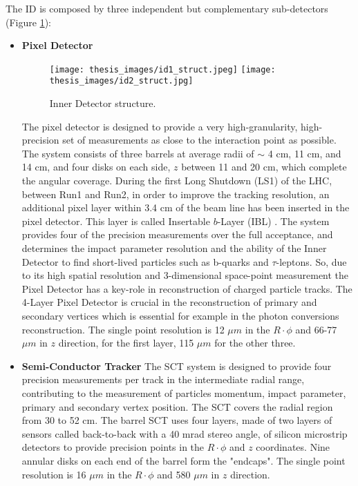 \documentclass[a4paper, oneside, 11pt, openright]{book}
\begin{document}
				The ID is composed by three independent but complementary sub-detectors \cite{ID_report} (Figure \ref{fig:ID_struct}):
				\begin{itemize}
					\item \textbf{Pixel Detector}
						\begin{figure}
							\centering
							\texttt{[image: thesis\_images/id1\_struct.jpeg]}
							\texttt{[image: thesis\_images/id2\_struct.jpg]}
							\caption{Inner Detector structure.}
							\label{fig:ID_struct}
						\end{figure}
						The pixel detector \cite{ID_inner_report} is designed to provide a very high-granularity, high-precision set of measurements as close to the interaction point as possible. The system consists of three barrels at average radii of $\sim$ 4 cm, 11 cm, and 14 cm, and four disks on each side, $z$ between 11 and 20 cm, which complete the angular coverage. During the first Long Shutdown (LS1) of the LHC, between Run1 and Run2, in order to improve the tracking resolution, an additional pixel layer within 3.4 cm of the beam line has been inserted in the pixel detector. This layer is called Insertable $b$-Layer (IBL) \cite{IBL_report}. The system provides four of the precision measurements over the full acceptance, and determines the impact parameter resolution and the ability of the Inner Detector to find short-lived particles such as b-quarks and $\tau$-leptons. So, due to its high spatial resolution and 3-dimensional space-point measurement the Pixel Detector has a key-role in reconstruction of charged particle tracks. The 4-Layer Pixel Detector is crucial in the reconstruction of primary and secondary vertices which is essential for example in the photon conversions reconstruction. The single point resolution is 12 $\mu m$ in the $R\cdot\phi$ and 66-77 $\mu m$ in $z$ direction, for the first layer, 115 $\mu m$ for the other three.
					\item \textbf{Semi-Conductor Tracker}
						The SCT system is designed to provide four precision measurements per track in the intermediate radial range, contributing to the measurement of particles momentum, impact parameter, primary and secondary vertex position. The SCT covers the radial region from 30 to 52 cm. The barrel SCT uses four layers, made of two layers of sensors called back-to-back with a 40 mrad stereo angle, of silicon microstrip detectors to provide precision points in the $R\cdot\phi$ and $z$ coordinates. Nine annular disks on each end of the barrel form the "endcaps". The single point resolution is 16 $\mu m$ in the $R\cdot\phi$ and 580 $\mu m$ in $z$ direction.

\end{itemize}
\end{document}
